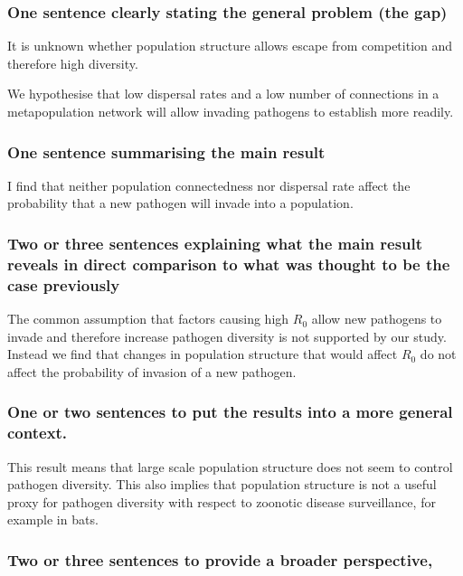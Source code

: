 \subsubsection{One sentence clearly stating the general problem (the gap)}
It is unknown whether population structure allows escape from competition and therefore high diversity.

We hypothesise that low dispersal rates and a low number of connections in a metapopulation network will allow invading pathogens to establish more readily. 

\subsubsection{One sentence summarising the main result}
I find that neither population connectedness nor dispersal rate affect the probability that a new pathogen will invade into a population.

\subsubsection{Two or three sentences explaining what the main result reveals in direct comparison to what was thought to be the case previously}
The common assumption that factors causing high $R_0$ allow new pathogens to invade and therefore increase pathogen diversity is not supported by our study.
Instead we find that changes in population structure that would affect $R_0$ do not affect the probability of invasion of a new pathogen.


\subsubsection{One or two sentences to put the results into a more general context.}
This result means that large scale population structure does not seem to control pathogen diversity.
This also implies that population structure is not a useful proxy for pathogen diversity with respect to zoonotic disease surveillance, for example in bats.


\subsubsection{Two or three sentences to provide a broader perspective, }





